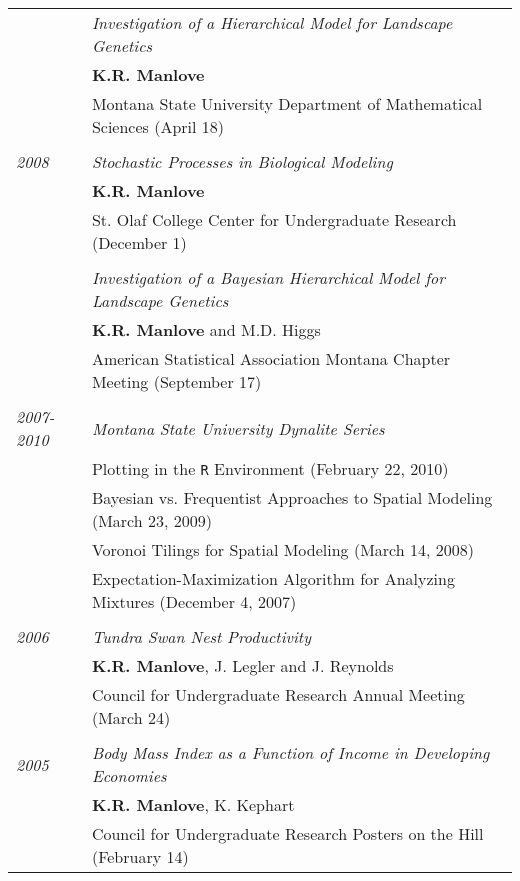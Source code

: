 \documentclass[9pt]{article}
\begin{document}
\begin{tabular}{p{.5cm} p{15cm}}

& \hspace{-.5cm}\textit{Investigation of a Hierarchical Model for Landscape Genetics}\\
& \textbf{K.R. Manlove}\\
& Montana State University Department of Mathematical Sciences (April 18)\\
\\
\hspace{-1.75cm} \footnotesize{\textit{2008}} & \hspace{-.5cm}\textit{Stochastic Processes in Biological Modeling}\\
& \textbf{K.R. Manlove}\\
& St. Olaf College Center for Undergraduate Research (December 1) \\
\\
& \hspace{-.5cm}\textit{Investigation of a Bayesian Hierarchical Model for Landscape Genetics}\\
& \textbf{K.R. Manlove} and M.D. Higgs\\
& American Statistical Association Montana Chapter Meeting (September 17) \\
\\
\hspace{-1.75cm} \footnotesize{\textit{2007-2010}}& \hspace{-.5cm}\textit{Montana State University Dynalite Series}\\
& Plotting in the \texttt{R} Environment (February 22, 2010) \\
& Bayesian vs. Frequentist Approaches to Spatial Modeling (March 23, 2009) \\
& Voronoi Tilings for Spatial Modeling (March 14, 2008) \\
& Expectation-Maximization Algorithm for Analyzing Mixtures (December 4, 2007) \\
\\
\hspace{-1.75cm} \footnotesize{\textit{2006}} & \hspace{-.5cm}\textit{Tundra Swan Nest Productivity}\\
& \textbf{K.R. Manlove}, J. Legler and J. Reynolds\\
& Council for Undergraduate Research Annual Meeting (March 24) \\
\\
\hspace{-1.75cm} \footnotesize{\textit{2005}} & \hspace{-.5cm}\textit{Body Mass Index as a Function of Income in Developing Economies}\\
& \textbf{K.R. Manlove}, K. Kephart\\
& Council for Undergraduate Research Posters on the Hill (February 14) \\
\end{tabular}
\end{document}
